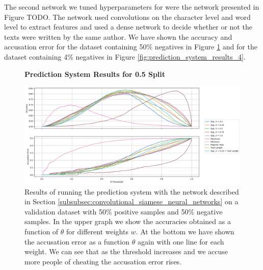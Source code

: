 The second network we tuned hyperparameters for were the network presented
in Figure TODO. The network used convolutions on the character level and
word level to extract features and used a dense network to decide whether or
not the texts were written by the same author. We have shown the accuracy
and accusation error for the dataset containing 50\% negatives in Figure
\ref{fig:prediction_system_results_3} and for the dataset containing 4\%
negatives in Figure \ref{fig:prediction_system_results_4}.

\begin{figure}
    \centering
    \textbf{Prediction System Results for 0.5 Split}\par\medskip
    \includegraphics[width=\textwidth]{./pictures/experiments/prediction_system_network6_50.png}
    \caption{Results of running the prediction system with the network described
        in Section \ref{subsubsec:convolutional_siamese_neural_networks} on a
        validation dataset with 50\% positive samples and 50\% negative samples.
        In the upper graph we show the accuracies obtained as a function of
        $\theta$ for different weights $w$. At the bottom we have shown the
        accusation error as a function $\theta$ again with one line for each
        weight. We can see that as the threshold increases and we accuse more
        people of cheating the accusation error rises.}
    \label{fig:prediction_system_results_3}
\end{figure}

